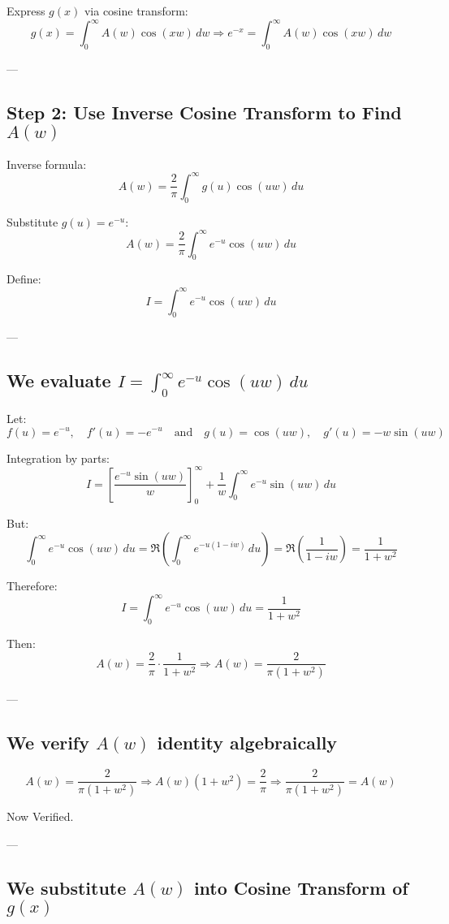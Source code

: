 \documentclass{article}
\begin{document}
Express \( g(x) \) via cosine transform:
\[
g(x) = \int_0^\infty A(w) \cos(xw) \, dw
\Rightarrow
e^{-x} = \int_0^\infty A(w) \cos(xw) \, dw
\]

---

\subsection*{Step 2: Use Inverse Cosine Transform to Find \( A(w) \)}

Inverse formula:
\[
A(w) = \frac{2}{\pi} \int_0^\infty g(u) \cos(uw) \, du
\]

Substitute \( g(u) = e^{-u} \):
\[
A(w) = \frac{2}{\pi} \int_0^\infty e^{-u} \cos(uw) \, du
\]

Define:
\[
I = \int_0^\infty e^{-u} \cos(uw) \, du
\]

---

\subsection*{We evaluate \( I = \int_0^\infty e^{-u} \cos(uw) \, du \)}

Let:
\[
f(u) = e^{-u}, \quad f'(u) = -e^{-u}
\quad \text{and} \quad
g(u) = \cos(uw), \quad g'(u) = -w \sin(uw)
\]

Integration by parts:
\[
I = \left[ \frac{e^{-u} \sin(uw)}{w} \right]_0^\infty + \frac{1}{w} \int_0^\infty e^{-u} \sin(uw) \, du
\]

But:
\[
\int_0^\infty e^{-u} \cos(uw) \, du = \Re\left( \int_0^\infty e^{-u(1 - iw)} \, du \right)
= \Re\left( \frac{1}{1 - iw} \right)
= \frac{1}{1 + w^2}
\]

Therefore:
\[
I = \int_0^\infty e^{-u} \cos(uw) \, du = \frac{1}{1 + w^2}
\]

Then:
\[
A(w) = \frac{2}{\pi} \cdot \frac{1}{1 + w^2}
\Rightarrow
A(w) = \frac{2}{\pi(1 + w^2)}
\]

---

\subsection*{We verify \( A(w) \) identity algebraically}

\[
A(w) = \frac{2}{\pi(1 + w^2)} \Rightarrow A(w)(1 + w^2) = \frac{2}{\pi}
\Rightarrow \frac{2}{\pi(1 + w^2)} = A(w)
\]

Now Verified.

---

\subsection*{We substitute \( A(w) \) into Cosine Transform of \( g(x) \)}
\end{document}
